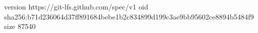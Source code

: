 version https://git-lfs.github.com/spec/v1
oid sha256:b71d236064d37ff891684bebe1b2c834899d199c3ae9bb95602ce8894b5484f9
size 87540
